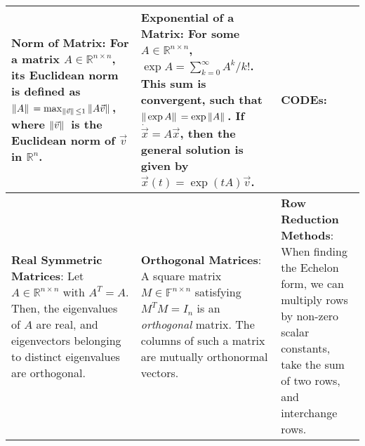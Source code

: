 \clearpage
\begin{tabular}{|m{.31\linewidth}|m{.31\linewidth}|m{.31\linewidth}|}
\hline

\textbf{Norm of Matrix}:
    For a matrix $ A \in \mathbb{R}^{n \times n} $, its Euclidean norm is
    defined as $ \|A\|\, = \max_{\|\vec{v}\|\, \leq 1} \|A \vec{v}\|\, $,
    where $ \|\vec{v}\|\, $ is the Euclidean norm of $ \vec{v} $ in $
    \mathbb{R}^n $. &

\textbf{Exponential of a Matrix}:
    For some $ A \in \mathbb{R}^{n \times n} $, $ \exp A = \sum_{k=0}^\infty
    A^k/k! $. This sum is convergent, such that $ \|\exp A\|\, = \exp \|A\|\,
    $. If $ \dot{\vec{x}} = A\vec{x} $, then the general solution is given by $
    \vec{x}(t) = \exp(tA)\vec{v} $. &

\textbf{CODEs}:
    \smash{$
        \ldots\vec{x}(t) = \mathconst{e}^{tA}\vec{v} = M
        \begin{pmatrix}
            \mathconst{e}^{\lambda_1 t} & 0 & \ldots \\
            0 & \mathconst{e}^{\lambda_2 t} & \ldots \\
            \ldots & \ldots & \mathconst{e}^{\lambda_n t}
        \end{pmatrix}
        M^{-1}\vec{v}
    $} \\

\hline

\textbf{Real Symmetric Matrices}:
    Let $ A \in \mathbb{R}^{n \times n} $ with $ A^T = A $. Then, the
    eigenvalues of $ A $ are real, and eigenvectors belonging to distinct
    eigenvalues are orthogonal. &

\textbf{Orthogonal Matrices}:
    A square matrix $ M \in \mathbb{F}^{n \times n} $ satisfying $ M^T M = I_n $
    is an \emph{orthogonal} matrix. The columns of such a matrix are mutually
    orthonormal vectors. &

\textbf{Row Reduction Methods}:
    When finding the Echelon form, we can multiply rows by non-zero scalar
    constants, take the sum of two rows, and interchange rows. \\

\hline
\end{tabular}


